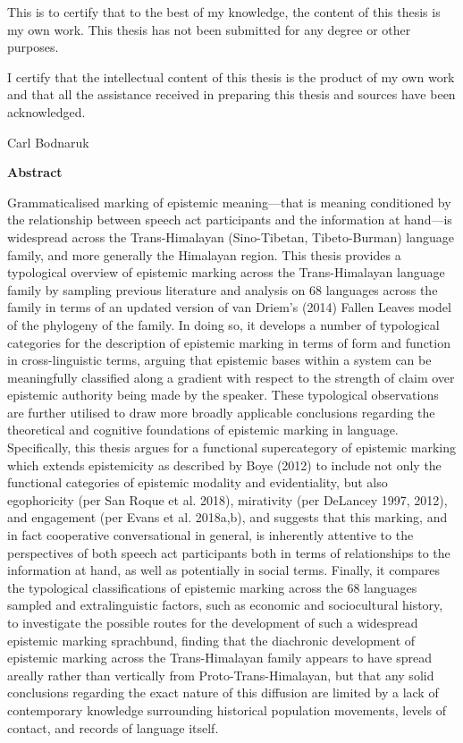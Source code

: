 \begin{center}
This is to certify that to the best of my knowledge, the content of this thesis is my own work. This thesis has not been submitted for any degree or other purposes.

I certify that the intellectual content of this thesis is the product of my own work and that all the assistance received in preparing this thesis and sources have been acknowledged.

\vspace{3cm}
Carl Bodnaruk

\end{center}
\newpage
\begin{center}
    \large
    \textbf{Abstract}
\end{center}
Grammaticalised marking of epistemic meaning---that is meaning conditioned by the relationship between speech act participants and the information at hand---is widespread across the Trans-Himalayan (Sino-Tibetan, Tibeto-Burman) language family, and more generally the Himalayan region. This thesis provides a typological overview of epistemic marking across the Trans-Himalayan language family by sampling previous literature and analysis on 68 languages across the family in terms of an updated version of van Driem's (2014) Fallen Leaves model of the phylogeny of the family. In doing so, it develops a number of typological categories for the description of epistemic marking in terms of form and function in cross-linguistic terms, arguing that epistemic bases within a system can be meaningfully classified along a gradient with respect to the strength of claim over epistemic authority being made by the speaker. These typological observations are further utilised to draw more broadly applicable conclusions regarding the theoretical and cognitive foundations of epistemic marking in language. Specifically, this thesis argues for a functional supercategory of epistemic marking which extends epistemicity as described by Boye (2012) to include not only the functional categories of epistemic modality and evidentiality, but also egophoricity (per San Roque et al. 2018), mirativity (per DeLancey 1997, 2012), and engagement (per Evans et al. 2018a,b), and suggests that this marking, and in fact cooperative conversational in general, is inherently attentive to the perspectives of both speech act participants both in terms of relationships to the information at hand, as well as potentially in social terms. Finally, it compares the typological classifications of epistemic marking across the 68 languages sampled and extralinguistic factors, such as economic and sociocultural history, to investigate the possible routes for the development of such a widespread epistemic marking sprachbund, finding that the diachronic development of epistemic marking across the Trans-Himalayan family appears to have spread areally rather than vertically from Proto-Trans-Himalayan, but that any solid conclusions regarding the exact nature of this diffusion are limited by a lack of contemporary knowledge surrounding historical population movements, levels of contact, and records of language itself.

